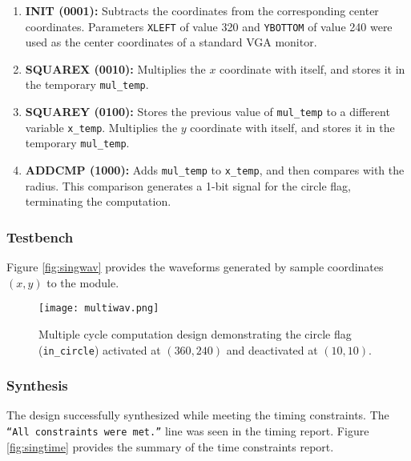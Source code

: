 \documentclass[paper=usletter, fontsize=12pt]{article}
\begin{document}
        \begin{enumerate}

            \item \textbf{INIT (0001): } Subtracts the coordinates from the
            corresponding center coordinates. Parameters \texttt{XLEFT} of
            value 320 and \texttt{YBOTTOM} of value 240 were used as the center
            coordinates of a standard VGA monitor.

            \item \textbf{SQUAREX (0010): } Multiplies the $x$ coordinate with
            itself, and stores it in the temporary \texttt{mul\_temp}.

            \item \textbf{SQUAREY (0100): } Stores the previous value of
            \texttt{mul\_temp} to a different variable \texttt{x\_temp}.
            Multiplies the $y$ coordinate with itself, and stores it in the
            temporary \texttt{mul\_temp}.

            \item \textbf{ADDCMP (1000): } Adds \texttt{mul\_temp} to
            \texttt{x\_temp}, and then compares with the radius. This
            comparison generates a 1-bit signal for the circle flag,
            terminating the computation.

        \end{enumerate}

        \subsubsection{Testbench} Figure \ref{fig:singwav} provides the
        waveforms generated by sample coordinates $(x, y)$ to the module.
        \begin{figure}[ht]
            \begin{center}
                \texttt{[image: multiwav.png]}
                \caption{Multiple cycle computation design demonstrating the
                circle flag (\texttt{in\_circle}) activated at $(360, 240)$ and
                deactivated at $(10,10)$.}
                \label{fig:multiwav}
            \end{center}
        \end{figure}

        \subsubsection{Synthesis} The design successfully synthesized while
        meeting the timing constraints. The \texttt{``All constraints were
        met.''} line was seen in the timing report. Figure \ref{fig:singtime}
        provides the summary of the time constraints report.
\end{document}
